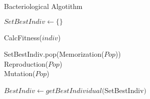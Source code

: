 \begin{algorithm}
		\caption{Bacteriological Algotithm\label{alg:ba}}


		$SetBestIndiv \leftarrow \{\}$

		 {
			 {
				CalcFitness($indiv$)
			}
	
			SetBestIndiv.pop(Memorization($Pop$))\\
			Reproduction($Pop$)\\
			Mutation($Pop$)				

		}

		$BestIndiv \leftarrow getBestIndividual($SetBestIndiv$)$
		
\end{algorithm}


